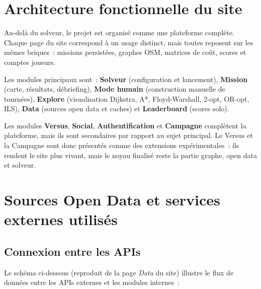 \documentclass[a4paper, 12pt, twoside]{article}
\begin{document}
\section{Architecture fonctionnelle du site}

Au-del\`{a} du solveur, le projet est organis\'{e} comme une plateforme compl\`{e}te. Chaque page
du site correspond \`{a} un usage distinct, mais toutes reposent sur les m\^{e}mes briques~:
missions persist\'{e}es, graphes OSM, matrices de co\^{u}t, scores et comptes joueurs.

Les modules principaux sont~: \textbf{Solveur} (configuration et lancement), \textbf{Mission}
(carte, r\'{e}sultats, d\'{e}briefing), \textbf{Mode humain} (construction manuelle de tourn\'{e}es),
\textbf{Explore} (visualisation Dijkstra, A*, Floyd-Warshall, 2-opt, OR-opt, ILS),
\textbf{Data} (sources open data et caches) et \textbf{Leaderboard} (scores solo).

Les modules \textbf{Versus}, \textbf{Social}, \textbf{Authentification} et \textbf{Campagne}
compl\`{e}tent la plateforme, mais ils sont secondaires par rapport au sujet principal.
Le Versus et la Campagne sont donc pr\'{e}sent\'{e}s comme des extensions exp\'{e}rimentales~:
ils rendent le site plus vivant, mais le noyau finalis\'{e} reste la partie graphe,
open data et solveur.

\section{Sources Open Data et services externes utilis\'{e}s}

\subsection{Connexion entre les APIs}

Le sch\'{e}ma ci-dessous (reproduit de la page \textit{Data} du site) illustre le flux de donn\'{e}es
entre les APIs externes et les modules internes~:
\end{document}
